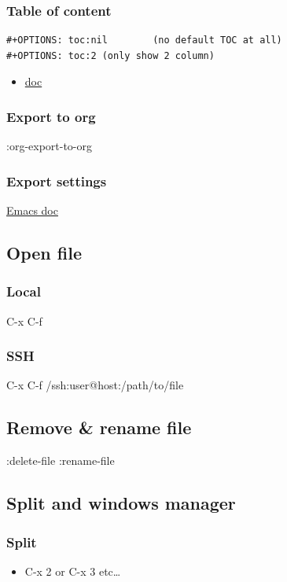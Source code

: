 \documentclass[11pt]{article}
\begin{document}
\subsubsection*{Table of content}
\label{sec:orgfdc7f60}
\begin{verbatim}
#+OPTIONS: toc:nil        (no default TOC at all)
#+OPTIONS: toc:2 (only show 2 column)
\end{verbatim}
\begin{itemize}
\item \href{https://emacsdocs.org/docs/org/Table-of-Contents}{doc}
\label{sec:org2bfdfa5}
\end{itemize}
\subsubsection*{Export to org}
\label{sec:org859794b}
:org-export-to-org
\subsubsection*{Export settings}
\label{sec:org1d926b6}
\href{https://emacsdocs.org/docs/org/Export-Settings}{Emacs doc}
\subsection*{Open file}
\label{sec:org5c2b020}
\subsubsection*{Local}
\label{sec:org20d20b4}
C-x C-f
\subsubsection*{SSH}
\label{sec:orgd0caa94}
C-x C-f
/ssh:user@host:/path/to/file
\subsection*{Remove \& rename file}
\label{sec:org7a9bd09}
:delete-file
:rename-file
\subsection*{Split and windows manager}
\label{sec:orgb4efd45}
\subsubsection*{Split}
\label{sec:org903fb65}
\begin{itemize}
\item C-x 2 or C-x 3 etc\ldots{}
\end{itemize}
\end{document}
